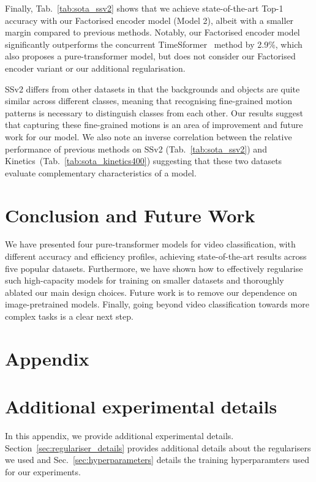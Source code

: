 \documentclass[10pt,twocolumn,letterpaper]{article}
\begin{document}
Finally, Tab.~\ref{tab:sota_ssv2} shows that we achieve state-of-the-art Top-1 accuracy with our Factorised encoder model (Model 2), albeit with a smaller margin compared to previous methods.
Notably, our Factorised encoder model significantly outperforms the concurrent TimeSformer~\cite{bertasius_arxiv_2021} method by 2.9\%, which also proposes a pure-transformer model, but does not consider our Factorised encoder variant or our additional regularisation.

SSv2 differs from other datasets in that the backgrounds and objects are quite similar across different classes, meaning that recognising fine-grained motion patterns is necessary to distinguish classes from each other.
Our results suggest that capturing these fine-grained motions is an area of improvement and future work for our model.
We also note an inverse correlation between the relative performance of previous methods on SSv2 (Tab.~\ref{tab:sota_ssv2}) and Kinetics~(Tab.~\ref{tab:sota_kinetics400})
suggesting that these two datasets evaluate complementary characteristics of a model.

 \section{Conclusion and Future Work}


We have presented four pure-transformer models for video classification, with different accuracy and efficiency profiles, achieving state-of-the-art results across five popular datasets.
Furthermore, we have shown how to effectively regularise such high-capacity models for training on smaller datasets and thoroughly ablated our main design choices.
Future work is to remove our dependence on image-pretrained models.
Finally, going beyond video classification towards more complex tasks is a clear next step. 
{\small


}

\clearpage
\appendix

\section*{Appendix}
\section{Additional experimental details}

In this appendix, we provide additional experimental details.
Section~\ref{sec:regulariser_details} provides additional details about the regularisers we used and Sec.~\ref{sec:hyperparameters} details the training hyperparamters used for our experiments.
\end{document}
